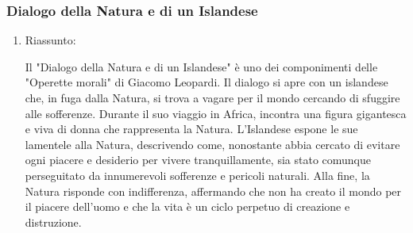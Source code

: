 \documentclass{article}
\begin{document}
\subsubsection{Dialogo della Natura e di un Islandese}
\begin{enumerate}
    \item Riassunto:

    Il "Dialogo della Natura e di un Islandese" è uno dei componimenti delle "Operette morali" di Giacomo Leopardi. Il dialogo si apre con un islandese che, in fuga dalla Natura, si trova a vagare per il mondo cercando di sfuggire alle sofferenze. Durante il suo viaggio in Africa, incontra una figura gigantesca e viva di donna che rappresenta la Natura. L'Islandese espone le sue lamentele alla Natura, descrivendo come, nonostante abbia cercato di evitare ogni piacere e desiderio per vivere tranquillamente, sia stato comunque perseguitato da innumerevoli sofferenze e pericoli naturali. Alla fine, la Natura risponde con indifferenza, affermando che non ha creato il mondo per il piacere dell'uomo e che la vita è un ciclo perpetuo di creazione e distruzione.


\end{enumerate}
\end{document}
